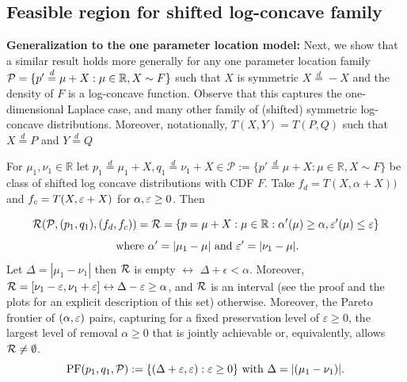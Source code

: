 \subsection{Feasible region for shifted log-concave family}
\textbf{Generalization to the one parameter location model:} Next, we show that a similar result holds more generally for any one parameter location family $\mathcal{P}=\{p' \overset{d}{=} \mu+ X: \mu \in \mathbb{R},  X \sim F\}$ such that $X$ is symmetric $X \overset{d}{=} -X$ and the density of $F$ is a log-concave function. Observe that this captures the one-dimensional Laplace case, and many other family of (shifted) symmetric log-concave distributions. Moreover, notationally, $T(X,Y)= T(P,Q)$ such that $X\overset{d}{=} P$ and $Y \overset{d}{=}Q$

\begin{proposition} \label{prop:FFRLC}
For $\mu_1, \nu_1 \in \mathbb{R}$ let $p_1 \overset{d}{=} \mu_1+X , q_1 \overset{d}{=} \nu_1+X\in \mathcal{P}:= \{p' \overset{d}{=} \mu+ X: \mu \in \mathbb{R},  X \sim F\}$ be class of shifted log concave distributions with  CDF $F$. Take $f_d= T(X,\alpha+X))$ and $f_c= T(X, \varepsilon +X)$ for $\alpha, \varepsilon \geq 0$. Then 

\begin{equation} \label{eq:XFR}
\mathcal{R}(\mathcal{P}, (p_1,q_1), (f_d,f_c)) =
\mathcal{R}= \{p= \mu+X: \mu \in \mathbb{R}: \alpha'(\mu) \geq \alpha, \varepsilon'(\mu) \leq \varepsilon\} 
\end{equation}
\begin{equation} \label{eq:XFRparameters0}
\text{ where } \alpha'= |\mu_1 -\mu|  \text{ and }\varepsilon'= |\nu_1 -\mu|. 
\end{equation}
Let $\Delta= |\mu_1- \nu_1|$ then $\mathcal{R}$ is empty $\leftrightarrow$ $ \Delta + \epsilon <\alpha $. Moreover, $\mathcal{R}= [\nu_1- \varepsilon, \nu_1+\varepsilon]\leftrightarrow \Delta - \varepsilon \geq \alpha $, and $\mathcal{R}$ is an interval (see the proof and the plots for an explicit description of this set) otherwise. 
Moreover, the Pareto frontier of $(\alpha, \varepsilon)$ pairs, capturing for a fixed preservation level of $\varepsilon \geq 0$, the largest level of removal $\alpha \geq 0$  that is jointly achievable or, equivalently, allows $\mathcal{R} \neq \emptyset$.
\begin{equation} \label{eq:ParetoLC}
    \text{PF}(p_1, q_1, \mathcal{P}) := \{(\Delta +\varepsilon, \varepsilon): \varepsilon \geq 0\} \text{ with } \Delta = |(\mu_1- \nu_1)|.
\end{equation}
\end{proposition}


